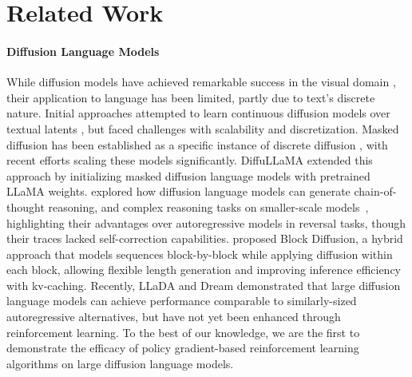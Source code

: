 \section{Related Work}
\label{sec:related}

\paragraph{Diffusion Language Models}
While diffusion models have achieved remarkable success in the visual domain \citep{songscore, ho2020denoising}, their application to language has been limited, partly due to text's discrete nature. Initial approaches attempted to learn continuous diffusion models over textual latents \citep{austin2021structured, gulrajani2023likelihood}, but faced challenges with scalability and discretization. Masked diffusion has been established as a specific instance of discrete diffusion \citep{austin2021structured, sahoo2024simple, shi2024simplified, ou2024your,nie2024scaling}, with recent efforts scaling these models significantly. DiffuLLaMA \citep{gong2025scaling} extended this approach by initializing masked diffusion language models with pretrained LLaMA weights. \citet{yediffusion} explored how diffusion language models can generate chain-of-thought reasoning, and complex reasoning tasks on smaller-scale models~\citep{ye2024beyond}, highlighting their advantages over autoregressive models in reversal tasks, though their traces lacked self-correction capabilities. \citet{arriola2025block} proposed Block Diffusion, a hybrid approach that models sequences block-by-block while applying diffusion within each block, allowing flexible length generation and improving inference efficiency with kv-caching. Recently, LLaDA \citep{nie2025largelanguagediffusionmodels} and Dream \citep{dream2025} demonstrated that large diffusion language models can achieve performance comparable to similarly-sized autoregressive alternatives, but have not yet been enhanced through reinforcement learning. To the best of our knowledge, we are the first to demonstrate the efficacy of policy gradient-based reinforcement learning algorithms on large diffusion language models. 

